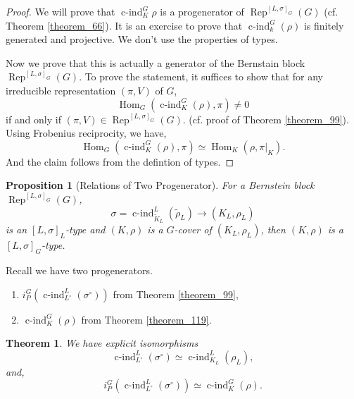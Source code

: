 \documentclass[8pt]{article}
\newtheorem{theorem}{Theorem} [section]
\newtheorem{proposition}{Proposition}[section]
\DeclareMathOperator{\cind}{c-ind}
\DeclareMathOperator{\Rep}{Rep}
\DeclareMathOperator{\Hom}{Hom}
\begin{document}
\begin{proof}
  We will prove that $\cind_K^G\rho$ is a progenerator of $\Rep^{[L,\sigma]_G}(G)$ (cf. Theorem \ref{theorem_66}). It is an exercise to prove that $\cind_k^G(\rho)$ is finitely generated and projective. We don't use the properties of types. 
  \par Now we prove that this is actually a generator of the Bernstain block $\Rep^{[L,\sigma]_G}(G)$. To prove the statement, it suffices to show that for any irreducible representation $(\pi,V)$ of $G$,
  \begin{equation*}
    \Hom_G(\cind_K^G(\rho),\pi)\not=0
  \end{equation*}
  if and only if $(\pi,V)\in\Rep^{[L,\sigma]_G}(G)$.  (cf. proof of Theorem \ref{theorem_99}). Using Frobenius reciprocity, we have,
  \begin{equation*}
    \Hom_G(\cind_K^G(\rho),\pi)\simeq\Hom_K(\rho,\pi|_K).
  \end{equation*}
  And the claim follows from the defintion of types.
\end{proof}

\begin{proposition}[Relations of Two Progenerator]
  For a Bernstein block $\Rep^{[L,\sigma]_G}(G)$,
  \begin{equation*}
    \sigma=\cind_{\widetilde{K}_L}^L(\widetilde{\rho}_L)\to (K_L,\rho_L)
  \end{equation*}
  is an $[L,\sigma]_L$-type and $(K,\rho)$ is a $G$-cover of $(K_L,\rho_L)$, then $(K,\rho)$ is a $[L,\sigma]_G$-type.
\end{proposition}

Recall we have two progenerators.
\begin{enumerate}[1).]
  \item $i_P^G(\cind_{L^\circ}^L(\sigma^\circ))$ from Theorem \ref{theorem_99},
  \item $\cind_K^G(\rho)$ from Theorem \ref{theorem_119}.
\end{enumerate}

\begin{theorem}
  \label{theorem_120}
  We have explicit isomorphisms 
  \begin{equation*}
  \cind_{L^\circ}^L(\sigma^\circ)\simeq\cind_{K_L}^L(\rho_L),
  \end{equation*}
  and,
  \begin{equation*}
  i_P^G(\cind_{L^\circ}^L(\sigma^\circ))\simeq\cind_K^G(\rho).
  \end{equation*}
\end{theorem}
\end{document}
